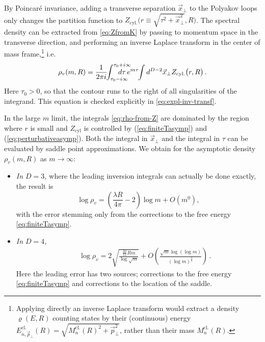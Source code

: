 \documentclass[
 reprint,
 amsmath,
 pre,
 amssymb,
 nofootinbib,
 aps,
 longbibliography,
]{revtex4-1}
\newcommand{\<}{{\langle}}
\renewcommand{\>}{{\rangle}}
\begin{document}
By Poincar\'e invariance, adding a transverse separation $\vec x_\bot$ to the Polyakov loops only changes the partition function to $Z_{\text{cyl.}}\big(r\equiv\sqrt{\tau^2 + \vec x_\bot^2},R\big)$. The spectral density can be extracted from \eqref{eq:ZfromK} by passing to momentum space in the transverse direction, and performing an inverse Laplace transform in the center of mass frame,\footnote{\label{foot:muVSE}Applying directly an inverse Laplace transform would extract a density $\varrho(E,R)$ counting states by their (continuous) energy $E^{\text{cl.}}_{n,\vec p_\bot}(R) = \sqrt{M^{\text{cl.}}_n(R)^2 + \vec p_\bot^2}$, rather than their mass $M^{\text{cl.}}_n(R)$.
} i.e.
\begin{equation}\label{eq:rho-from-Z}
    \rho_v( m,R) = \frac{1}{2\pi i}\hspace{-3pt}\int_{\tau_0 - i\infty}^{\tau_0+i\infty} \hspace{-20pt}d\tau\, e^{ m \tau}\hspace{-3pt} \int d^{D-2}\vec x_\bot Z_{\text{cyl.}}\big(r,R\big)\,.
\end{equation}
Here $\tau_0 >0$, so that the contour runs to the right of all singularities of the integrand. This equation is checked explicitly in \eqref{eq:expl-inv-transf}.

In the large $ m$ limit, the integrals \eqref{eq:rho-from-Z} are dominated by the region where $r$ is small and $Z_{\text{cyl}}$ is controlled by (\ref{eq:finiteTasymp}) and (\ref{eq:perturbativeasymp}). Both the integral in $\vec x_\bot$ and the integral in $\tau$ can be evaluated by saddle point approximations. We obtain for the asymptotic density $\rho_v( m,R)$ as $ m \to \infty$:
\begin{itemize}
    \item[a.] \textit{In $D=3$,} where the leading inversion integrals can actually be done exactly, the result is
\begin{equation}
    \label{eq:D=3rho}
    \log\rho_v = \left({\frac{\lambda R}{4\pi}-2}\right) \log m
    + O( m^0),
\end{equation}
    with the error
stemming only from the corrections to the free energy \eqref{eq:finiteTasymp}.

    \item[b.] \textit{In $D=4$,}
\begin{align}\label{eq:D=4rho}
	\hspace{22pt} \log \rho_v = 2\sqrt{\frac{\frac{3\pi}{11}R m}{\log \sqrt  m}}
    + O\left(\frac{\sqrt{ m} \log(\log m)}{(\log  m)^\frac{3}{2}}\right)\,.
\end{align}
    Here the leading error has two sources; corrections to the free energy \eqref{eq:finiteTasymp} and corrections to the location of the saddle.
\end{itemize}
\end{document}
